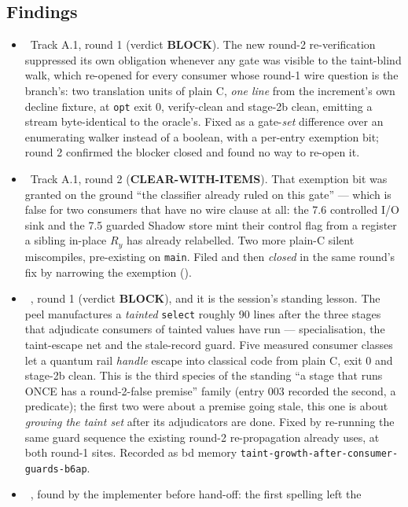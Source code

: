 \subsection*{Findings}
\begin{itemize}
  \item \fconfirmed\ Track A.1, round 1 (verdict \textbf{BLOCK}). The new round-2 re-verification
    suppressed its own obligation whenever any gate was visible to the taint-blind walk, which re-opened
     for every consumer whose round-1 wire question is the branch's: two translation units of
    plain C, \emph{one line} from the increment's own decline fixture, at \texttt{opt} exit 0,
    verify-clean and stage-2b clean, emitting a stream byte-identical to the oracle's. Fixed as a
    gate-\emph{set} difference over an enumerating walker instead of a boolean, with a per-entry
    exemption bit; round 2 confirmed the blocker closed and found no way to re-open it.
  \item \fpreexisting\ Track A.1, round 2 (\textbf{CLEAR-WITH-ITEMS}). That exemption bit was granted on
    the ground ``the classifier already ruled on this gate'' --- which is false for two consumers that
    have no wire clause at all: the 7.6 controlled I/O sink and the 7.5 guarded Shadow store mint their
    control flag from a register a sibling in-place \(R_y\) has already relabelled. Two more plain-C
    silent miscompiles, pre-existing on \texttt{main}. Filed and then \emph{closed} in the same round's
    fix by narrowing the exemption ().
  \item \fconfirmed\ , round 1 (verdict \textbf{BLOCK}), and it is the session's standing lesson.
    The peel manufactures a \emph{tainted} \texttt{select} roughly 90 lines after the three stages that
    adjudicate consumers of tainted values have run --- specialisation, the taint-escape net and the
    stale-record guard. Five measured consumer classes let a quantum rail \emph{handle} escape into
    classical code from plain C, exit 0 and stage-2b clean. This is the third species of the standing
    ``a stage that runs ONCE has a round-2-false premise'' family (entry 003 recorded the second, a
    predicate); the first two were about a premise going stale, this one is about \emph{growing the taint
    set} after its adjudicators are done. Fixed by re-running the same guard sequence the existing
    round-2 re-propagation already uses, at both round-1 sites. Recorded as bd memory
    \texttt{taint-growth-after-consumer-guards-b6ap}.
  \item \fconfirmed\ , found by the implementer before hand-off: the first spelling left the

\end{itemize}
